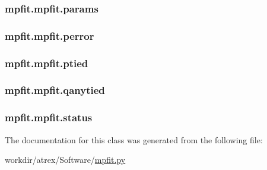 \hypertarget{classmpfit_1_1mpfit_aeeab3c562889cb4fe9d347eeb7e8b40e}{
\subsubsection[{params}]{\setlength{\rightskip}{0pt plus 5cm}mpfit.\-mpfit.\-params}}\label{classmpfit_1_1mpfit_aeeab3c562889cb4fe9d347eeb7e8b40e}
\hypertarget{classmpfit_1_1mpfit_a7fd7c6e0276941f29ae138be862c05fa}{
\subsubsection[{perror}]{\setlength{\rightskip}{0pt plus 5cm}mpfit.\-mpfit.\-perror}}\label{classmpfit_1_1mpfit_a7fd7c6e0276941f29ae138be862c05fa}
\hypertarget{classmpfit_1_1mpfit_a121863b0d2d0ffca2d375b7a6f19a567}{
\subsubsection[{ptied}]{\setlength{\rightskip}{0pt plus 5cm}mpfit.\-mpfit.\-ptied}}\label{classmpfit_1_1mpfit_a121863b0d2d0ffca2d375b7a6f19a567}
\hypertarget{classmpfit_1_1mpfit_a88c16eda6a0a5ddf3296b1b2d82eba06}{
\subsubsection[{qanytied}]{\setlength{\rightskip}{0pt plus 5cm}mpfit.\-mpfit.\-qanytied}}\label{classmpfit_1_1mpfit_a88c16eda6a0a5ddf3296b1b2d82eba06}
\hypertarget{classmpfit_1_1mpfit_a07bef52fd34a9c9d76d605d5d5ff6e6e}{
\subsubsection[{status}]{\setlength{\rightskip}{0pt plus 5cm}mpfit.\-mpfit.\-status}}\label{classmpfit_1_1mpfit_a07bef52fd34a9c9d76d605d5d5ff6e6e}


The documentation for this class was generated from the following file\-:\begin{DoxyCompactItemize}
\item 
workdir/atrex/\-Software/\hyperlink{mpfit_8py}{mpfit.\-py}\end{DoxyCompactItemize}

